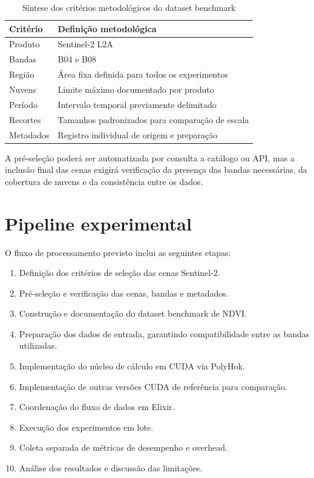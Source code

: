 \documentclass[tcc,capa]{texufpel}
\begin{document}
\begin{table}[h]
    \centering
    \caption{Síntese dos critérios metodológicos do dataset benchmark}
    \begin{tabular}{ll}
        \hline
        \textbf{Critério} & \textbf{Definição metodológica} \\
        \hline
        Produto & Sentinel-2 L2A \\
        Bandas & B04 e B08 \\
        Região & Área fixa definida para todos os experimentos \\
        Nuvens & Limite máximo documentado por produto \\
        Período & Intervalo temporal previamente delimitado \\
        Recortes & Tamanhos padronizados para comparação de escala \\
        Metadados & Registro individual de origem e preparação \\
        \hline
    \end{tabular}
    \label{tab:criterios-metodologicos-dataset}
\end{table}

A pré-seleção poderá ser automatizada por consulta a catálogo ou API, mas a inclusão final das cenas exigirá verificação da presença das bandas necessárias, da cobertura de nuvens e da consistência entre os dados.

\section{Pipeline experimental}

O fluxo de processamento previsto inclui as seguintes etapas:

\begin{enumerate}
    \item Definição dos critérios de seleção das cenas Sentinel-2.
    \item Pré-seleção e verificação das cenas, bandas e metadados.
    \item Construção e documentação do dataset benchmark de NDVI.
    \item Preparação dos dados de entrada, garantindo compatibilidade entre as bandas utilizadas.
    \item Implementação do núcleo de cálculo em CUDA via PolyHok.
    \item Implementação de outras versões CUDA de referência para comparação.
    \item Coordenação do fluxo de dados em Elixir.
    \item Execução dos experimentos em lote.
    \item Coleta separada de métricas de desempenho e overhead.
    \item Análise dos resultados e discussão das limitações.
\end{enumerate}
\end{document}
